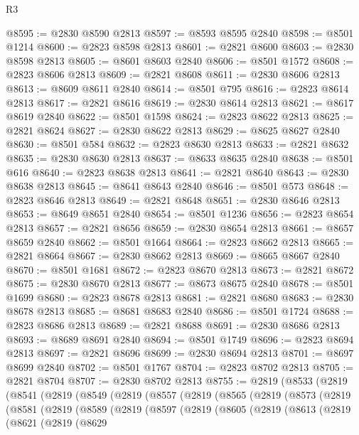 \begin{lexlean}{R3}
\begin{coremodule}
@8595 := @2830 @8590 @2813
@8597 := @8593 @8595 @2840
@8598 := @8501 @1214
@8600 := @2823 @8598 @2813
@8601 := @2821 @8600
@8603 := @2830 @8598 @2813
@8605 := @8601 @8603 @2840
@8606 := @8501 @1572
@8608 := @2823 @8606 @2813
@8609 := @2821 @8608
@8611 := @2830 @8606 @2813
@8613 := @8609 @8611 @2840
@8614 := @8501 @795
@8616 := @2823 @8614 @2813
@8617 := @2821 @8616
@8619 := @2830 @8614 @2813
@8621 := @8617 @8619 @2840
@8622 := @8501 @1598
@8624 := @2823 @8622 @2813
@8625 := @2821 @8624
@8627 := @2830 @8622 @2813
@8629 := @8625 @8627 @2840
@8630 := @8501 @584
@8632 := @2823 @8630 @2813
@8633 := @2821 @8632
@8635 := @2830 @8630 @2813
@8637 := @8633 @8635 @2840
@8638 := @8501 @616
@8640 := @2823 @8638 @2813
@8641 := @2821 @8640
@8643 := @2830 @8638 @2813
@8645 := @8641 @8643 @2840
@8646 := @8501 @573
@8648 := @2823 @8646 @2813
@8649 := @2821 @8648
@8651 := @2830 @8646 @2813
@8653 := @8649 @8651 @2840
@8654 := @8501 @1236
@8656 := @2823 @8654 @2813
@8657 := @2821 @8656
@8659 := @2830 @8654 @2813
@8661 := @8657 @8659 @2840
@8662 := @8501 @1664
@8664 := @2823 @8662 @2813
@8665 := @2821 @8664
@8667 := @2830 @8662 @2813
@8669 := @8665 @8667 @2840
@8670 := @8501 @1681
@8672 := @2823 @8670 @2813
@8673 := @2821 @8672
@8675 := @2830 @8670 @2813
@8677 := @8673 @8675 @2840
@8678 := @8501 @1699
@8680 := @2823 @8678 @2813
@8681 := @2821 @8680
@8683 := @2830 @8678 @2813
@8685 := @8681 @8683 @2840
@8686 := @8501 @1724
@8688 := @2823 @8686 @2813
@8689 := @2821 @8688
@8691 := @2830 @8686 @2813
@8693 := @8689 @8691 @2840
@8694 := @8501 @1749
@8696 := @2823 @8694 @2813
@8697 := @2821 @8696
@8699 := @2830 @8694 @2813
@8701 := @8697 @8699 @2840
@8702 := @8501 @1767
@8704 := @2823 @8702 @2813
@8705 := @2821 @8704
@8707 := @2830 @8702 @2813
@8755 := @2819
    (@8533
      (@2819
        (@8541
          (@2819
            (@8549
              (@2819
                (@8557
                  (@2819
                    (@8565
                      (@2819
                        (@8573
                          (@2819
                            (@8581
                              (@2819
                                (@8589
                                  (@2819
                                    (@8597
                                      (@2819
                                        (@8605
                                          (@2819
                                            (@8613
                                              (@2819
                                                (@8621
                                                  (@2819
                                                    (@8629

\end{coremodule}
\end{lexlean}

